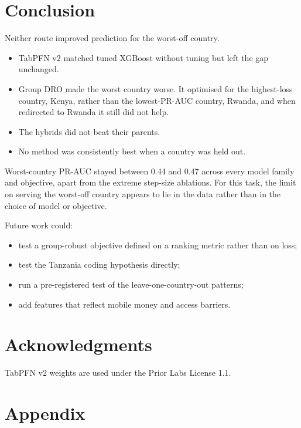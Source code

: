 \documentclass[11pt]{article}
\begin{document}
\section{Conclusion}

Neither route improved prediction for the worst-off country.
\begin{itemize}
  \item TabPFN v2 matched tuned XGBoost without tuning but left the gap unchanged.
  \item Group DRO made the worst country worse. It optimised for the highest-loss country, Kenya, rather than the lowest-PR-AUC country, Rwanda, and when redirected to Rwanda it still did not help.
  \item The hybrids did not beat their parents.
  \item No method was consistently best when a country was held out.
\end{itemize}
Worst-country PR-AUC stayed between 0.44 and 0.47 across every model family and objective, apart from the extreme step-size ablations. For this task, the limit on serving the worst-off country appears to lie in the data rather than in the choice of model or objective.

Future work could:
\begin{itemize}
  \item test a group-robust objective defined on a ranking metric rather than on loss;
  \item test the Tanzania coding hypothesis directly;
  \item run a pre-registered test of the leave-one-country-out patterns;
  \item add features that reflect mobile money and access barriers.
\end{itemize}

\section*{Acknowledgments}
TabPFN v2 weights are used under the Prior Labs License 1.1.




\clearpage
\appendix
\section*{Appendix}
\setcounter{section}{1}
\setcounter{table}{0}
\renewcommand{\thetable}{A\arabic{table}}
\end{document}

